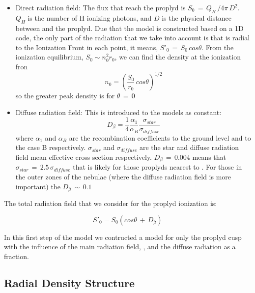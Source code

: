 \documentclass[aaspp]{article}
\begin{document}
\begin{itemize}
\item{Direct radiation field: The \tc flux that reach the proplyd is $S_0 \, = \, Q_H \, / 4\pi \, D^2$. $Q_H$ is the number of H ionizing photons, and $D$ is the physical distance between \tc and the proplyd. Due that the model is constructed based on  a 1D code, the only part of the radiation that we take into account is that is radial to the Ionization Front in each point, it means, $S'_0 \, = \, S_0 \, cos \theta$. From the ionization equilibrium, $S_0 \sim n_0^2 r_0$, we can find the density at the ionization fron
    \begin{equation}
      n_0 = \left( \frac{S_0}{r_0} \, cos \theta \right) ^{1/2}
    \end{equation}
}
so the greater peak density is for $\theta \, = \, 0$
\item{Diffuse radiation field: This is introduced to the models as constant:
    \begin{equation}
      D_\beta = \frac{1}{4} \frac{\alpha_1}{\alpha_B} \frac{\sigma_{star}}{\sigma_{diffuse}}
    \end{equation}
    where $\alpha_1$ and $\alpha_B$ are the recombination coefficients to the ground level and to the case B respectively.  $\sigma_{star}$ and $\sigma_{diffuse}$ are the star and diffuse radiation field mean effective cross section respectively. $D_\beta \, = \, 0.004$ means that $\sigma_{star} \, = \, 2.5 \, \sigma_{diffuse}$ that is likely for those proplyds nearest to \tc. For those in the outer zones of the nebulae (where the diffuse radiation field is more important) the $D_\beta \, \sim \, 0.1$
}
\end{itemize}

The total radiation field that we consider for the proplyd ionization is: 

\begin{equation}
  S'_0 = S_0 (cos \theta \, + \, D_\beta)
\end{equation}

In this first step of the model we contructed a model for only the proplyd cusp with the influence of the main radiation field, \tc, and the diffuse radiation as a \tc fraction.

\subsection{Radial Density Structure}
\label{sec:density}
\end{document}
